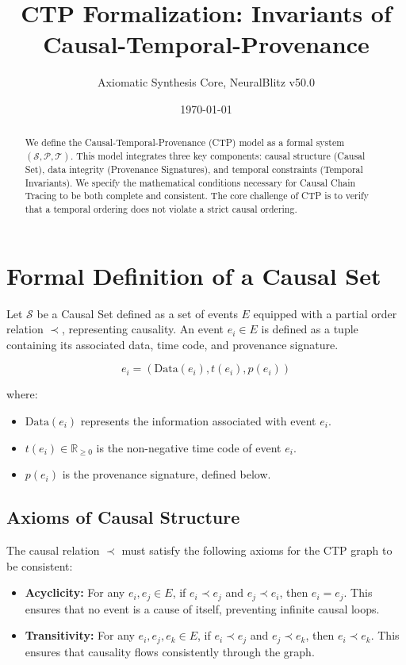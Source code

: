 \documentclass{article}
\title{CTP Formalization: Invariants of Causal-Temporal-Provenance}
\author{Axiomatic Synthesis Core, NeuralBlitz v50.0}
\affil[ ]{\emph{The Omega Prime Reality ($\Omega'$ )}}
\date{\today}
\begin{document}
\maketitle

\begin{abstract}
We define the Causal-Temporal-Provenance (CTP) model as a formal system $(\mathcal{S}, \mathcal{P}, \mathcal{T})$. This model integrates three key components: causal structure (Causal Set), data integrity (Provenance Signatures), and temporal constraints (Temporal Invariants). We specify the mathematical conditions necessary for Causal Chain Tracing to be both complete and consistent. The core challenge of CTP is to verify that a temporal ordering does not violate a strict causal ordering.
\end{abstract}

\section{Formal Definition of a Causal Set}
Let $\mathcal{S}$ be a Causal Set defined as a set of events $E$ equipped with a partial order relation $\prec$, representing causality. An event $e_i \in E$ is defined as a tuple containing its associated data, time code, and provenance signature.

\begin{equation}
\label{eq:event_tuple}
e_i = (\text{Data}(e_i), t(e_i), p(e_i))
\end{equation}

\noindent where:
\begin{itemize}
    \item $\text{Data}(e_i)$ represents the information associated with event $e_i$.
    \item $t(e_i) \in \mathbb{R}_{\ge 0}$ is the non-negative time code of event $e_i$.
    \item $p(e_i)$ is the provenance signature, defined below.
\end{itemize}

\subsection{Axioms of Causal Structure}
The causal relation $\prec$ must satisfy the following axioms for the CTP graph to be consistent:

\begin{itemize}
    \item \textbf{Acyclicity:} For any $e_i, e_j \in E$, if $e_i \prec e_j$ and $e_j \prec e_i$, then $e_i = e_j$. This ensures that no event is a cause of itself, preventing infinite causal loops.
    \item \textbf{Transitivity:} For any $e_i, e_j, e_k \in E$, if $e_i \prec e_j$ and $e_j \prec e_k$, then $e_i \prec e_k$. This ensures that causality flows consistently through the graph.
\end{itemize}
\end{document}
